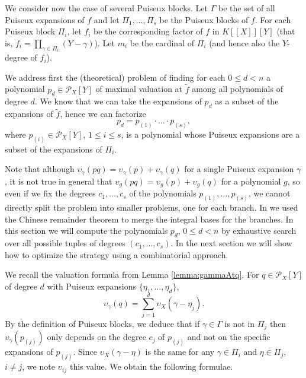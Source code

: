 \documentclass[a4paper,11pt]{amsart}%
\theoremstyle{definition}
\theoremstyle{plain}
\theoremstyle{remark}
\newcommand{\Px}{{\mathcal{P}_X}}
\begin{document}

We consider now the case of several Puiseux blocks.
Let $\Gamma$ be the set of all Puiseux expansions of $f$ and let $\Pi_1, \dots, \Pi_s$ be the Puiseux blocks of $f$.
For each Puiseux block $\Pi_{i}$, let $f_i$ be the corresponding
factor of $f$ in $K[[X]][Y]$ (that is, $f_i = \prod_{\gamma \in \Pi_i} (Y - \gamma)$). Let $m_i$ be the cardinal of $\Pi_i$ (and hence also the $Y$-degree of $f_i$).

We address first the (theoretical) problem of finding for each $0 \le d < n$ a polynomial $p_d \in \Px[Y]$ of maximal valuation at $\tilde f$ among all polynomials of degree $d$.
We know that we can take the expansions of $p_d$ as a subset of the expansions of $\tilde f$, hence we can factorize
$$
p_d = p_{(1)} \cdot \dots \cdot p_{(s)},
$$
where $p_{(i)} \in \mathcal{P}_{X}[Y]$, $1 \le i \le s$, is a polynomial whose Puiseux expansions are a subset of the expansions of $\Pi_i$.

Note that although $\upsilon_{\gamma}(pq) = \upsilon_{\gamma}(p) + \upsilon_{\gamma}(q)$ for a single Puiseux expansion $\gamma$, it is not true in general that $\upsilon_{g}(pq) = \upsilon_{g}(p) + \upsilon_{g}(q)$ for a polynomial $g$, so even if we fix the degrees $c_1, \dots, c_s$ of the polynomials $p_{(1)}, \dots, p_{(s)}$, we cannot directly split the problem into smaller problems, one for each branch. In \cite{intbas} we used the Chinese remainder theorem to merge the integral bases for the branches. In this section we will compute the polynomials $p_d$, $0 \le d < n$ by exhaustive search over all possible tuples of degrees $(c_1, \dots, c_s)$. In the next section we will show how to optimize the strategy using a combinatorial approach.

We recall the valuation formula from Lemma \ref{lemma:gammaAtq}. For $q \in \mathcal{P}_{X}[Y]$ of degree $d$ with Puiseux expansions $\{\eta_1, \dots, \eta_d\}$,
$$
\upsilon_{\gamma}(q)= \sum_{j=1}^{d}\upsilon_X(\gamma-\eta_{j}).
$$
By the definition of Puiseux blocks, we deduce that if $\gamma \in \Gamma$ is not in $\Pi_{j}$ then $\upsilon_{\gamma} (p_{(j)})$ only depends on the degree $c_j$ of $p_{(j)}$ and not on the specific expansions of $p_{(j)}$.
Since $\upsilon_X(\gamma - \eta)$ is the same for any $\gamma \in\Pi_{i}$ and $\eta \in \Pi_j$, $i \ne j$, we note $\upsilon_{ij}$ this value. We obtain the following formulae.
\end{document}
